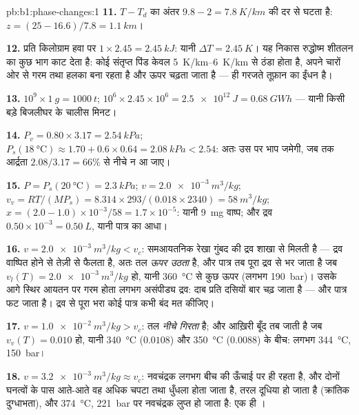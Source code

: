 \begin{solution}{pb:b1:phase-changes:1}
\textbf{11.} $T - T_d$ का अंतर $9.8 - 2 = \qty{7.8}{K/km}$ की दर से घटता है: $z = (25 - 16.6)/
7.8 = \qty{1.1}{km}$।

\textbf{12.} प्रति किलोग्राम हवा पर $1 \times 2.45 = \qty{2.45}{kJ}$: यानी $\Delta T =
\qty{2.45}{K}$। यह निकास रुद्धोष्म शीतलन का कुछ भाग काट देता है: कोई
संतृप्त पिंड केवल \qtyrange{5}{6}{K/km} से ठंडा होता है, अपने चारों ओर से
गरम तथा हलका बना रहता है और ऊपर चढ़ता जाता है ---  ही गरजते
तूफ़ान का ईंधन है।

\textbf{13.} $10^9 \times \qty{1}{g} = \qty{1000}{t}$; $10^6 \times 2.45 \times 10^6 =
\qty{2.5e12}{J} = \qty{0.68}{GW h}$ --- यानी किसी बड़े बिजलीघर के चालीस मिनट।

\textbf{14.} $P_v = 0.80 \times 3.17 = \qty{2.54}{kPa}$; $P_s(\qty{18}{\degreeCelsius})
\approx 1.70 + 0.6 \times 0.64 = \qty{2.08}{kPa} < 2.54$: अतः उस पर भाप जमेगी, जब तक
आर्द्रता $2.08/3.17 = 66\%$ से नीचे न आ जाए।

\textbf{15.} $P = P_s(\qty{20}{\degreeCelsius}) = \qty{2.3}{kPa}$; $v = \qty{2.0e-3}{m^3/kg}$;
$v_v = RT/(MP_s) = 8.314 \times 293/(0.018 \times 2340) = \qty{58}{m^3/kg}$; $x =
(2.0 - 1.0) \times 10^{-3}/58 = 1.7 \times 10^{-5}$: यानी \qty{9}{mg} वाष्प; और
द्रव $0.50 \times 10^{-3} = \qty{0.50}{L}$, यानी पात्र का आधा।

\textbf{16.} $v = \qty{2.0e-3}{m^3/kg} < v_c$: समआयतनिक रेखा गुंबद की द्रव
शाखा से मिलती है --- द्रव वाष्पित होने से तेज़ी से फैलता है, अतः तल
\emph{ऊपर उठता} है, और पात्र तब पूरा द्रव से भर जाता है जब $v_l(T) =
\qty{2.0e-3}{m^3/kg}$ हो, यानी \qty{360}{\degreeCelsius} से कुछ ऊपर (लगभग
\qty{190}{bar})। उसके आगे स्थिर आयतन पर गरम होता लगभग असंपीड्य द्रव: दाब
प्रति  दसियों बार चढ़ जाता है --- और पात्र फट जाता है। द्रव से पूरा
भरा कोई पात्र कभी बंद मत कीजिए।

\textbf{17.} $v = \qty{1.0e-2}{m^3/kg} > v_c$: तल \emph{नीचे गिरता} है; और
आख़िरी बूँद तब जाती है जब $v_v(T) = 0.010$ हो, यानी \qty{340}{\degreeCelsius}
($0.0108$) और \qty{350}{\degreeCelsius} ($0.0088$) के बीच: लगभग
\qty{344}{\degreeCelsius}, \qty{150}{bar}।

\textbf{18.} $v = \qty{3.2e-3}{m^3/kg} \approx v_c$: नवचंद्रक लगभग बीच की
ऊँचाई पर ही रहता है, और दोनों घनत्वों के पास आते-आते वह अधिक चपटा तथा
धुँधला होता जाता है, तरल दूधिया हो जाता है (क्रांतिक दुग्धाभता), और
\qty{374}{\degreeCelsius}, \qty{221}{bar} पर नवचंद्रक लुप्त हो जाता है: एक ही ।


\end{solution}
